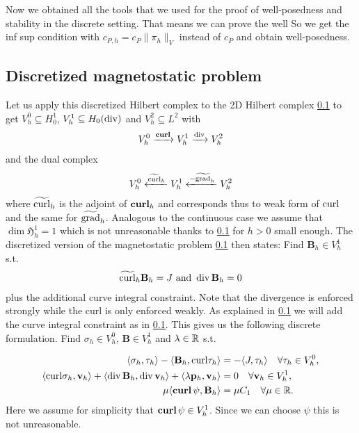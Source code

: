 \documentclass[../master_thesis.tex]{subfiles}
\begin{document}
Now we obtained all the tools that we used for the proof of well-posedness and stability 
in the discrete setting. That means we can prove the well
So we get the inf sup condition with $c_{P,h} = c_P \lVert \pi_h \rVert _V$ instead of $c_P$ 
and obtain well-posedness.

\subsection{Discretized magnetostatic problem}

Let us apply this discretized Hilbert complex to the 2D Hilbert complex \ref{}
to get $V^0_h \subseteq H^1_0$, $V^1_h \subseteq H_0(\operatorname{div})$ and $V^2_h \subseteq L^2$
with 
\begin{align*}
    V^0_h \xrightarrow{\veccurl} V^1_h \xrightarrow{\diver} V^2_h
\end{align*}
and the dual complex 
\begin{align*}
    V^0_h \xleftarrow{\widetilde{\operatorname{curl}}_h} V^1_h \xleftarrow{-\widetilde{\operatorname{grad}}_h} V^2_h
\end{align*}
where $\widetilde{\operatorname{curl}}_h$ is the adjoint of $\veccurl_h$ and corresponds thus to
weak form of $\operatorname{curl}$ and the same for $\widetilde{\operatorname{grad}}_h$.
Analogous to the continuous case we assume that $\dim \mathfrak{H}_h^1 = 1$ 
which is not unreasonable thanks to \ref{} for $h>0$ small enough.
The discretized version of the magnetostatic problem \ref{} then states: 
Find $\mathbf{B}_h \in V_h^1$ s.t.
\begin{align*}
    \widetilde{\operatorname{curl}}_h \mathbf{B}_h = J \text{ and }
    \operatorname{div} \mathbf{B}_h = 0
\end{align*}
plus the additional curve integral constraint.
Note that the divergence is enforced strongly while the curl is only enforced weakly.
As explained in \ref{} we will add the curve integral constraint as in \ref{}.
This gives us the following discrete formulation. Find 
$\sigma_h \in V_h^0$, $\mathbf{B} \in V_h^1$ and $\lambda \in \mathbb{R}$ s.t.

\begin{align*}
    \langle \sigma_h, \tau_h \rangle - \langle \mathbf{B}_h, \mathbf{\curl}\tau_h \rangle 
    &=  -\langle J, \tau_h \rangle \quad \forall \tau_h \in V_h^0, 
    \\ \langle \mathbf{\curl}\sigma_h, \mathbf{v}_h \rangle + \langle \diver \mathbf{B}_h, \diver \mathbf{v}_h \rangle 
    + \langle \lambda \mathbf{p}_h, \mathbf{v}_h \rangle 
    &= 0 \quad \forall \mathbf{v}_h \in V^1_h, 
    \\ \mu \langle \bm{\curl} \psi, \mathbf{B}_h \rangle &= \mu C_1 \quad \forall \mu \in \real.
\end{align*}
Here we assume for simplicity that $\veccurl \psi \in V_h^1$. Since 
we can choose $\psi$ this is not unreasonable. 
\end{document}
